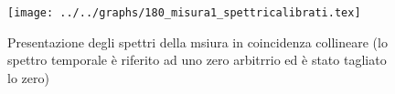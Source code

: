 \begin{figure}[h] \centering\texttt{[image: ../../graphs/180\_misura1\_spettricalibrati.tex]}\caption{Presentazione degli spettri della msiura in coincidenza collineare (lo spettro temporale è riferito ad uno zero arbitrrio ed è stato tagliato lo zero) }\label{gr:180_misura1_spettricalibrati} \end{figure}
